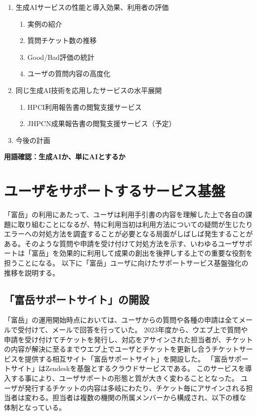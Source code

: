 \documentclass{jsaxiesproc}
\begin{document}
\begin{enumerate}
\item 生成AIサービスの性能と導入効果、利用者の評価
	\begin{enumerate}
		\item 実例の紹介
		\item 質問チケット数の推移
		\item Good/Bad評価の統計
		\item ユーザの質問内容の高度化
	\end{enumerate}

\item 同じ生成AI技術を応用したサービスの水平展開
	\begin{enumerate}
		\item HPCI利用報告書の閲覧支援サービス
		\item JHPCN成果報告書の閲覧支援サービス（予定）
	\end{enumerate}

\item 今後の計画

\end{enumerate}

\textbf{用語確認：生成AIか、単にAIとするか}

\clearpage



\section{ユーザをサポートするサービス基盤}
「富岳」の利用にあたって、ユーザは利用手引書の内容を理解した上で各自の課題に取り組むことになるが、特に利用当初は利用方法についての疑問が生じたりエラーへの対処方法を調査することが必要となる局面がしばしば発生することがある。そのような質問や申請を受け付けて対処方法を示す、いわゆるユーザサポートは「富岳」を効果的に利用して成果の創出を後押しする上での重要な役割を担うことになる。
以下に「富岳」ユーザに向けたサポートサービス基盤強化の推移を説明する。

\subsection{「富岳サポートサイト」の開設}

「富岳」の運用開始時点においては、ユーザからの質問や各種の申請は全てメールで受付けて、メールで回答を行っていた。
2023年度から、ウエブ上で質問や申請を受け付けてチケットを発行し、対応をアサインされた担当者が、チケットの内容が解決に至るまでウエブ上でユーザとチケットを更新し合うチケットサービスを提供する相互サイト「富岳サポートサイト」を開設した。
「富岳サポートサイト」はZendeskを基盤とするクラウドサービスである。
このサービスを導入する事により、ユーザサポートの形態と質が大きく変わることとなった。
ユーザが発行するチケットの内容は多岐にわたり、チケット毎にアサインされる担当者は変わる。担当者は複数の機関の所属メンバーから構成され、以下の様な体制となっている。
\end{document}
